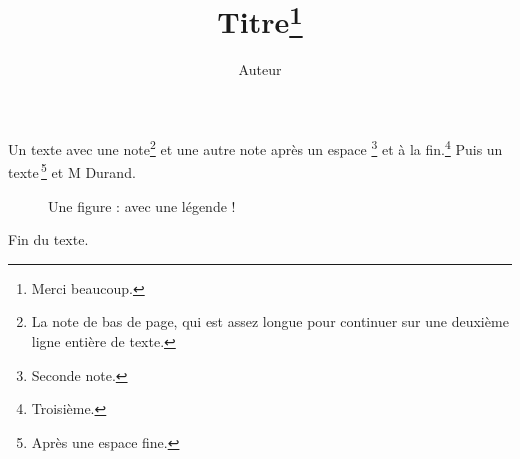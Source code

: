 \documentclass{article}
\title{Titre\thanks{Merci beaucoup.}}
\author{Auteur}
\begin{document}
\maketitle
Un texte avec une note\footnote{La note de bas de page, qui est assez longue pour continuer sur une deuxième ligne entière de texte.} et une autre note après un espace \footnote{Seconde note.} et à la fin.\footnote{Troisième.} Puis un texte\,\footnote{Après une espace fine.} et M Durand.
\begin{figure}[h]
\centering
\caption{Une figure : avec une légende !}
\end{figure}
\begin{table}[h]
\caption{Un tableau dont la légende est très longue, si longue qu'elle doit passer à la ligne suivante dans la page}
\end{table}
Fin du texte.
\end{document}
